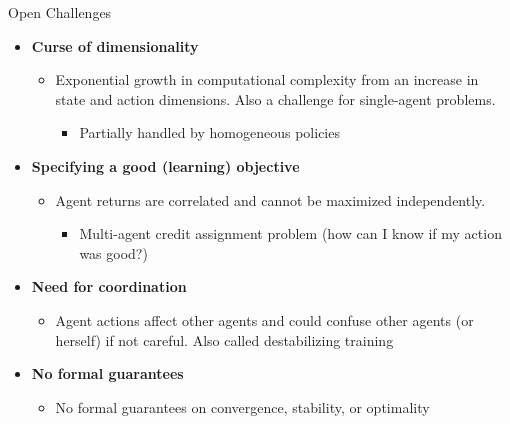 \documentclass[presentation, 8pt]{beamer}\mode<presentation>{\usetheme{AMSBolognaFC}}
\begin{document}
\begin{frame}{Open Challenges}
	\begin{itemize}
		\item \textbf{Curse of dimensionality}
		\begin{itemize}
			\item Exponential growth in computational complexity from an increase in state and action
			dimensions. Also a challenge for single-agent problems. 
			\begin{itemize}
				\item Partially handled by homogeneous policies 
			\end{itemize}
		\end{itemize}
		\item \textbf{Specifying a good (learning) objective}
		\begin{itemize}
			\item Agent returns are correlated and cannot be maximized independently.
			\begin{itemize}
				\item Multi-agent credit assignment problem (how can I know if my action was good?)
			\end{itemize}
		\end{itemize}
		\item \textbf{Need for coordination}
		\begin{itemize}
			\item Agent actions affect other agents and could confuse other agents (or herself) if not
			careful. Also called destabilizing training
		\end{itemize}
		\item \textbf{No formal guarantees}
		\begin{itemize}
			\item No formal guarantees on convergence, stability, or optimality
		\end{itemize}

	\end{itemize}
\end{frame}
\end{document}
